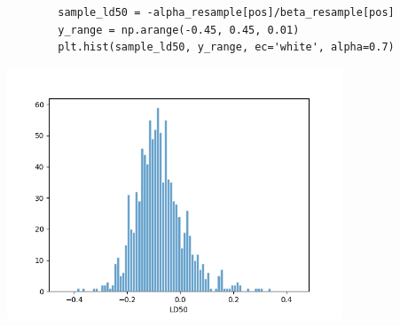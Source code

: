 \documentclass[11pt,a4paper,english]{article}
\begin{document}
      \begin{verbatim}
        sample_ld50 = -alpha_resample[pos]/beta_resample[pos]
        y_range = np.arange(-0.45, 0.45, 0.01)
        plt.hist(sample_ld50, y_range, ec='white', alpha=0.7)
      \end{verbatim}
      \includegraphics[width=10cm]{5_histogram.png}
\end{document}
